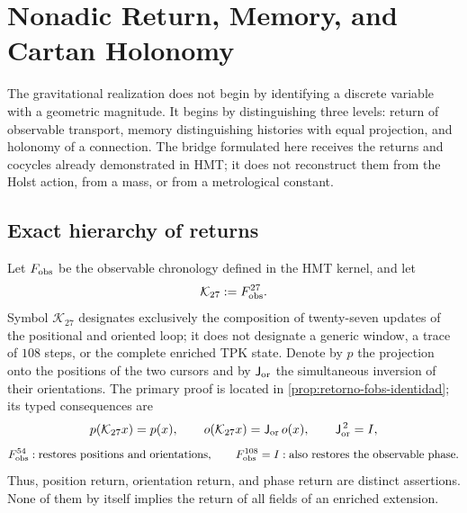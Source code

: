 \chapter{Nonadic Return, Memory, and Cartan Holonomy}
\label{chap:puente-retorno-holonomia-cartan}

The gravitational realization does not begin by identifying a discrete variable
with a geometric magnitude. It begins by distinguishing three levels: return
of observable transport, memory distinguishing histories with equal
projection, and holonomy of a connection. The bridge formulated here
receives the returns and cocycles already demonstrated in HMT; it does not reconstruct them
from the Holst action, from a mass, or from a metrological constant.

\section{Exact hierarchy of returns}
\label{sec:jerarquia-retornos-27-54-108}

Let \(F_{\rm obs}\) be the observable chronology defined in the HMT kernel, and let
\[
 \mathcal K_{27}:=F_{\rm obs}^{27}.
\]
Symbol \(\mathcal K_{27}\) designates exclusively the composition of
twenty-seven updates of the positional and oriented loop; it does not designate a
generic window, a trace of \(108\) steps, or the complete enriched TPK
state. Denote by \(p\) the projection onto the positions of the two
cursors and by \(\mathsf J_{\rm or}\) the simultaneous inversion of their
orientations. The primary proof is located in
\cref{prop:retorno-fobs-identidad}; its typed consequences are
\[
 p(\mathcal K_{27}x)=p(x),\qquad
 o(\mathcal K_{27}x)=\mathsf J_{\rm or}\,o(x),
 \qquad \mathsf J_{\rm or}^{\,2}=I,
\]
\[
 F_{\rm obs}^{54}:
 \text{restores positions and orientations},
 \qquad
 F_{\rm obs}^{108}=I:
 \text{also restores the observable phase}.
\]
Thus, position return, orientation return, and phase return are
distinct assertions. None of them by itself implies the return of
all fields of an enriched extension.

